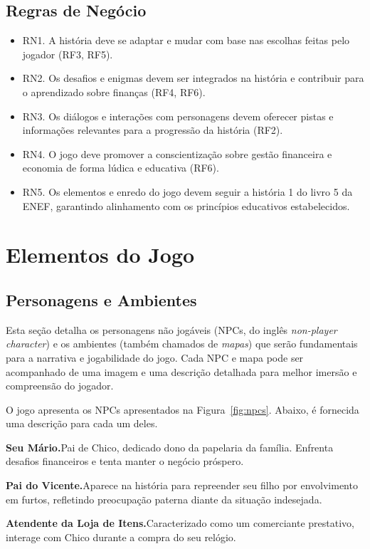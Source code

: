 \subsection*{Regras de Negócio}
\begin{itemize}
	\item RN1. A história deve se adaptar e mudar com base nas escolhas feitas pelo jogador (RF3, RF5).
	\item RN2. Os desafios e enigmas devem ser integrados na história e contribuir para o aprendizado sobre finanças (RF4, RF6).
	\item RN3. Os diálogos e interações com personagens devem oferecer pistas e informações relevantes para a progressão da história (RF2).
	\item RN4. O jogo deve promover a conscientização sobre gestão financeira e economia de forma lúdica e educativa (RF6).
	\item RN5. Os elementos e enredo do jogo devem seguir a história 1 do livro 5 da ENEF, garantindo alinhamento com os princípios educativos estabelecidos.
\end{itemize}

\section{Elementos do Jogo}

\subsection{Personagens e Ambientes}
Esta seção detalha os personagens não jogáveis (NPCs, do inglês \textit{non-player character}) e os ambientes (também chamados de \textit{mapas}) que serão fundamentais para a narrativa e jogabilidade do jogo. Cada NPC e mapa pode ser acompanhado de uma imagem e uma descrição detalhada para melhor imersão e compreensão do jogador.

O jogo apresenta os NPCs apresentados na Figura~\ref{fig:npcs}. Abaixo, é fornecida uma descrição para cada um deles.

\medskip\noindent \textbf{Seu Mário.}\quad Pai de Chico, dedicado dono da papelaria da família. Enfrenta desafios financeiros e tenta manter o negócio próspero.

\medskip\noindent \textbf{Pai do Vicente.}\quad Aparece na história para repreender seu filho por envolvimento em furtos, refletindo preocupação paterna diante da situação indesejada.

\medskip\noindent \textbf{Atendente da Loja de Itens.}\quad Caracterizado como um comerciante prestativo, interage com Chico durante a compra do seu relógio.

